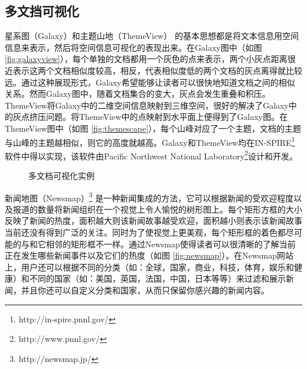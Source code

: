 \subsection{多文挡可视化}
星系图（Galaxy）和主题山地（ThemeView）\cite{Wise1995} 的基本思想都是将文本信息用空间信息来表示，然后将空间信息可视化的表现出来。在Galaxy图中（如图 \ref{fig:galaxyview}），每个单独的文档都用一个灰色的点来表示，两个小灰点距离很近表示这两个文档相似度较高，相反，代表相似度低的两个文档的灰点离得就比较远。通过这种展现形式，Galaxy希望能够让读者可以很快地知道文档之间的相似关系。然而Galaxy图中，随着文档集合的变大，灰点会发生重叠和积压。ThemeView将Galaxy中的二维空间信息映射到三维空间，很好的解决了Galaxy中的灰点挤压问题。将ThemeView中的点映射到水平面上便得到了Galaxy图。在ThemeView图中（如图 \ref{fig:themescape}），每个山峰对应了一个主题，文档的主题与山峰的主题越相似，则它的高度就越高。Galaxy和ThemeView均在IN-SPIRE\footnote{http://in-spire.pnnl.gov/}软件中得以实现，该软件由Pacific Northwest National Laboratory\footnote{http://www.pnnl.gov/}设计和开发。
\begin{figure}[htb]
    \centering
    \caption{多文档可视化实例}
    \label{fig:multi-doc-visual}
\end{figure}

新闻地图（Newsmap）\footnote{http://newsmap.jp/} 是一种新闻集成的方法，它可以根据新闻的受欢迎程度以及报道的数量将新闻组织在一个视觉上令人愉悦的树形图上。每个矩形方框的大小反映了新闻的热度，面积越大则该新闻故事越受欢迎，面积越小则表示该新闻故事当前还没有得到广泛的关注。同时为了使视觉上更美观，每个矩形框的着色都尽可能的与和它相邻的矩形框不一样。通过Newsmap使得读者可以很清晰的了解当前正在发生哪些新闻事件以及它们的热度（如图 \ref{fig:newsmap}）。在Newsmap网站上，用户还可以根据不同的分类（如：全球，国家，商业，科技，体育，娱乐和健康）和不同的国家（如：美国，英国，法国，中国，日本等等）来过滤和展示新闻，并且你还可以自定义分类和国家，从而只保留你感兴趣的新闻内容。

